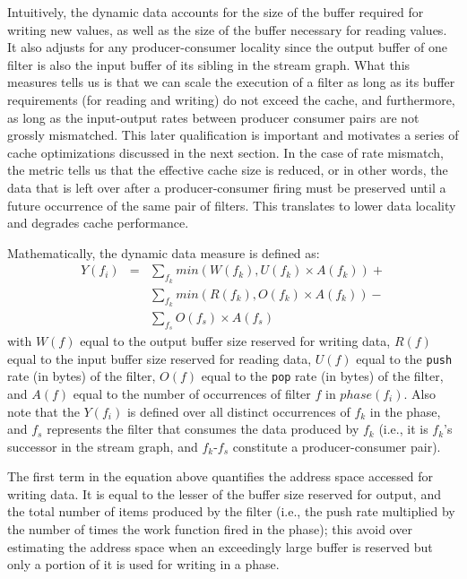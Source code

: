 Intuitively, the dynamic data accounts for the size of the buffer
required for writing new values, as well as the size of the buffer
necessary for reading values. It also adjusts for any
producer-consumer locality since the output buffer of one filter is
also the input buffer of its sibling in the stream graph. What this
measures tells us is that we can scale the execution of a filter as
long as its buffer requirements (for reading and writing) do not
exceed the cache, and furthermore, as long as the input-output rates
between producer consumer pairs are not grossly mismatched. This later
qualification is important and motivates a series of cache
optimizations discussed in the next section. In the case of rate
mismatch, the metric tells us that the effective cache size is
reduced, or in other words, the data that is left over after a
producer-consumer firing must be preserved until a future occurrence of
the same pair of filters. This translates to lower data locality and
degrades cache performance.

Mathematically, the dynamic data measure is defined as:
\begin{eqnarray}
  \nonumber
  Y(f_i) &=&\sum_{f_k} min(W(f_k), U(f_k) \times A(f_k)) + \\
  \nonumber
	   &&\sum_{f_k} min(R(f_k), O(f_k) \times A(f_k)) - \\
  \nonumber
         &&\sum_{f_s} O(f_s) \times A(f_s)
\end{eqnarray}
with $W(f)$ equal to the output buffer size reserved for writing data, $R(f)$
equal to the input buffer size reserved for reading data, $U(f)$ equal to the
{\tt push} rate (in bytes) of the filter, $O(f)$ equal to the {\tt pop} rate (in
bytes) of the filter, and $A(f)$ equal to the number of occurrences of
filter $f$ in $phase(f_i)$. Also note that the $Y(f_i)$ is defined
over all distinct occurrences of $f_k$ in the phase, and $f_s$
represents the filter that consumes the data produced by $f_k$ (i.e.,
it is $f_k$'s successor in the stream graph, and $f_k$-$f_s$
constitute a producer-consumer pair).

The first term in the equation above quantifies the address space
accessed for writing data. It is  equal to the lesser of the buffer size
reserved for output, and the total number of items produced by
the filter (i.e., the push rate multiplied by the number of times the
work function fired in the phase); this avoid over estimating the
address space when an exceedingly large buffer is reserved but only a
portion of it is used for writing in a phase.

